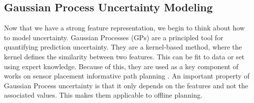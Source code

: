 

    
\subsection{Gaussian Process Uncertainty Modeling}
Now that we have a strong feature representation, we begin to think about how to model uncertainty. Gaussian Processes (GPs) \cite{Rasmussen2004} are a principled tool for quantifying prediction uncertainty. They are a kernel-based method, where the kernel defines the similarity between two features. This can be fit to data or set using expert knowledge. Because of this, they are used as a key component of works on sensor placement \cite{Krause2008Near-optimalStudies} informative path planning \cite{Fernandez2022InformativeAnalysis, Candela2020PlanetaryMapping, Candela2021}. An important property of Gaussian Process uncertainty is that it only depends on the features and not the associated values. This makes them applicable to offline planning. 

 
